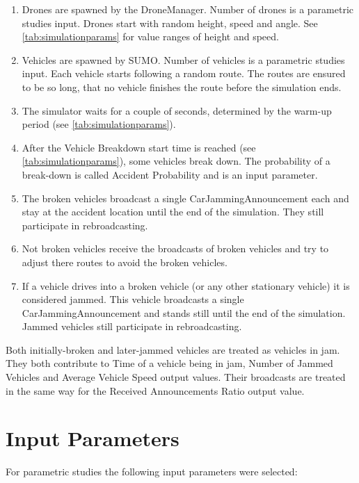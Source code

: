 \documentclass[]{nsm-thesis}
\begin{document}
\begin{enumerate}
	\item Drones are spawned by the DroneManager. Number of drones is a parametric studies input. Drones start with random height, speed and angle. See \cref{tab:simulationparams} for value ranges of height and speed.
	\item Vehicles are spawned by SUMO. Number of vehicles is a parametric studies input. Each vehicle starts following a random route. The routes are ensured to be so long, that no vehicle finishes the route before the simulation ends.
	\item The simulator waits for a couple of seconds, determined by the warm-up period (see \cref{tab:simulationparams}).
	\item After the Vehicle Breakdown start time is reached (see \cref{tab:simulationparams}), some vehicles break down. The probability of a break-down is called Accident Probability and is an input parameter.
  	\item The broken vehicles broadcast a single CarJammingAnnouncement each and stay at the accident location until the end of the simulation. They still participate in rebroadcasting.
	\item Not broken vehicles receive the broadcasts of broken vehicles and try to adjust there routes to avoid the broken vehicles.
	\item If a vehicle drives into a broken vehicle (or any other stationary vehicle) it is considered jammed. This vehicle broadcasts a single CarJammingAnnouncement and stands still until the end of the simulation. Jammed vehicles still participate in rebroadcasting.
\end{enumerate}

Both initially-broken and later-jammed vehicles are treated as vehicles in jam. They both contribute to Time of a vehicle being in jam, Number of Jammed Vehicles and Average Vehicle Speed output values. Their broadcasts are treated in the same way for the Received Announcements Ratio output value. 



\section{Input Parameters}

For parametric studies the following input parameters were selected:
\end{document}
